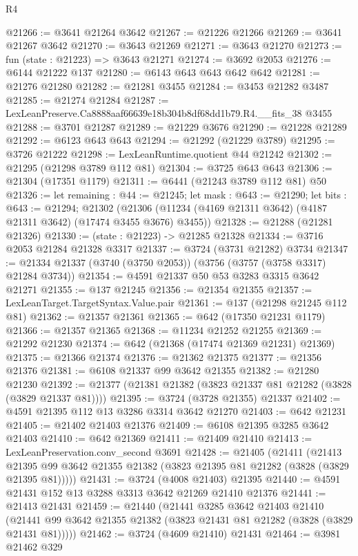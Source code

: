 \begin{lexlean}{R4}
\begin{coremodule}
@21266 := @3641 @21264 @3642
@21267 := @21226 @21266
@21269 := @3641 @21267 @3642
@21270 := @3643 @21269
@21271 := @3643 @21270
@21273 := fun (state : @21223) => @3643 @21271
@21274 := @3692 @2053
@21276 := @6144 @21222 @137
@21280 := @6143 @643 @643 @642 @642
@21281 := @21276 @21280
@21282 := @21281 @3455
@21284 := @3453 @21282 @3487
@21285 := @21274 @21284
@21287 := LexLeanPreserve.Ca8888aaf66639e18b304b8df68dd1b79.R4.__fits_38 @3455
@21288 := @3701 @21287
@21289 := @21229 @3676
@21290 := @21228 @21289
@21292 := @6123 @643 @643
@21294 := @21292 (@21229 @3789)
@21295 := @3726 @21222
@21298 := LexLeanRuntime.quotient @44 @21242
@21302 := @21295 (@21298 @3789 @112 @81)
@21304 := @3725 @643 @643
@21306 := @21304 (@17351 @1179)
@21311 := @6441 (@21243 @3789 @112 @81) @50
@21326 := let remaining : @44 := @21245;
  let mask : @643 := @21290;
  let bits : @643 := @21294;
  @21302 (@21306 (@11234 (@4169 @21311 @3642) (@4187 @21311 @3642) (@17474 @3455 @3676) @3455))
@21328 := @21288 (@21281 @21326)
@21330 := (state : @21223) -> @21285 @21328
@21334 := @3716 @2053 @21284 @21328 @3317
@21337 := @3724 (@3731 @21282) @3734
@21347 := @21334 @21337 (@3740 (@3750 @2053)) (@3756 (@3757 (@3758 @3317) @21284 @3734))
@21354 := @4591 @21337 @50 @53 @3283 @3315 @3642 @21271
@21355 := @137 @21245
@21356 := @21354 @21355
@21357 := LexLeanTarget.TargetSyntax.Value.pair
@21361 := @137 (@21298 @21245 @112 @81)
@21362 := @21357 @21361
@21365 := @642 (@17350 @21231 @1179)
@21366 := @21357 @21365
@21368 := @11234 @21252 @21255
@21369 := @21292 @21230
@21374 := @642 (@21368 (@17474 @21369 @21231) @21369)
@21375 := @21366 @21374
@21376 := @21362 @21375
@21377 := @21356 @21376
@21381 := @6108 @21337 @99 @3642 @21355
@21382 := @21280 @21230
@21392 := @21377 (@21381 @21382 (@3823 @21337 @81 @21282 (@3828 (@3829 @21337 @81))))
@21395 := @3724 (@3728 @21355) @21337
@21402 := @4591 @21395 @112 @13 @3286 @3314 @3642 @21270
@21403 := @642 @21231
@21405 := @21402 @21403 @21376
@21409 := @6108 @21395 @3285 @3642 @21403
@21410 := @642 @21369
@21411 := @21409 @21410
@21413 := LexLeanPreservation.conv_second @3691
@21428 := @21405
    (@21411
      (@21413 @21395 @99 @3642 @21355 @21382 (@3823 @21395 @81 @21282 (@3828 (@3829 @21395 @81)))))
@21431 := @3724 (@4008 @21403) @21395
@21440 := @4591 @21431 @152 @13 @3288 @3313 @3642 @21269 @21410 @21376
@21441 := @21413 @21431
@21459 := @21440
    (@21441
      @3285
      @3642
      @21403
      @21410
      (@21441 @99 @3642 @21355 @21382 (@3823 @21431 @81 @21282 (@3828 (@3829 @21431 @81)))))
@21462 := @3724 (@4609 @21410) @21431
@21464 := @3981 @21462 @329

\end{coremodule}
\end{lexlean}
